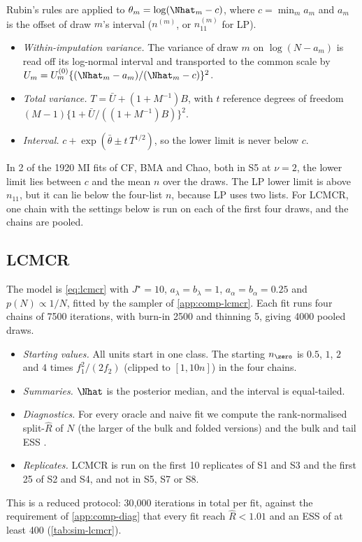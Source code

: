 Rubin's rules are applied to $\theta_m=\log(\Nhat_m-c)$, where $c=\min_m a_m$ and $a_m$ is the offset of draw $m$'s interval ($n^{(m)}$, or $n^{(m)}_{11}$ for LP).
\begin{itemize}
  \item \emph{Within-imputation variance.} The variance of draw $m$ on $\log(N-a_m)$ is read off its log-normal interval and transported to the common scale by $U_m=U_m^{(0)}\{(\Nhat_m-a_m)/(\Nhat_m-c)\}^2$.
  \item \emph{Total variance.} $T=\bar U+(1+M^{-1})B$, with $t$ reference degrees of freedom $(M-1)\{1+\bar U/((1+M^{-1})B)\}^2$.
  \item \emph{Interval.} $c+\exp(\bar\theta\pm t\,T^{1/2})$, so the lower limit is never below $c$.
\end{itemize}
In 2 of the 1920 MI fits of CF, BMA and Chao, both in S5 at $\nu=2$, the lower limit lies between $c$ and the mean $n$ over the draws. The LP lower limit is above $n_{11}$, but it can lie below the four-list $n$, because LP uses two lists. For LCMCR, one chain with the settings below is run on each of the first four draws, and the chains are pooled.

\subsection{LCMCR}\label{app:sim-lcmcr}

The model is \eqref{eq:lcmcr} with $J^\star=10$, $a_\lambda=b_\lambda=1$, $a_\alpha=b_\alpha=0.25$ and $p(N)\propto1/N$, fitted by the sampler of \cref{app:comp-lcmcr}. Each fit runs four chains of 7500 iterations, with burn-in 2500 and thinning 5, giving 4000 pooled draws.
\begin{itemize}
  \item \emph{Starting values.} All units start in one class. The starting $n_{\zero}$ is $0.5$, $1$, $2$ and $4$ times $f_1^2/(2f_2)$ (clipped to $[1,10n]$) in the four chains.
  \item \emph{Summaries.} $\Nhat$ is the posterior median, and the interval is equal-tailed.
  \item \emph{Diagnostics.} For every oracle and naive fit we compute the rank-normalised split-$\widehat R$ of $N$ (the larger of the bulk and folded versions) and the bulk and tail ESS \citep{vehtari2021}.
  \item \emph{Replicates.} LCMCR is run on the first 10 replicates of S1 and S3 and the first 25 of S2 and S4, and not in S5, S7 or S8.
\end{itemize}
This is a reduced protocol: 30{,}000 iterations in total per fit, against the requirement of \cref{app:comp-diag} that every fit reach $\widehat R<1.01$ and an ESS of at least 400 (\cref{tab:sim-lcmcr}).

